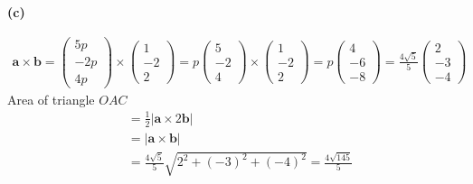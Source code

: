\documentclass[a4paper,11pt,oneside]{book}
\begin{document}
\par\smallskip\noindent\textbf{(c)}\par\nopagebreak{}\begin{align*}\mathbf a\times\mathbf b=\begin{pmatrix}5p\\-2p\\4p\end{pmatrix}\times\begin{pmatrix}1\\-2\\2\end{pmatrix}=p\begin{pmatrix}5\\-2\\4\end{pmatrix}\times\begin{pmatrix}1\\-2\\2\end{pmatrix}=p\begin{pmatrix}4\\-6\\-8\end{pmatrix}=\frac{4\sqrt5}{5}\begin{pmatrix}2\\-3\\-4\end{pmatrix}\end{align*}Area of triangle $OAC$\begin{align*}&=\tfrac12|\mathbf a\times2\mathbf b|\\ &=|\mathbf a\times\mathbf b|\\ &=\frac{4\sqrt5}{5}\sqrt{2^2+(-3)^2+(-4)^2}=\frac{4\sqrt{145}}{5}\end{align*}
\end{document}
